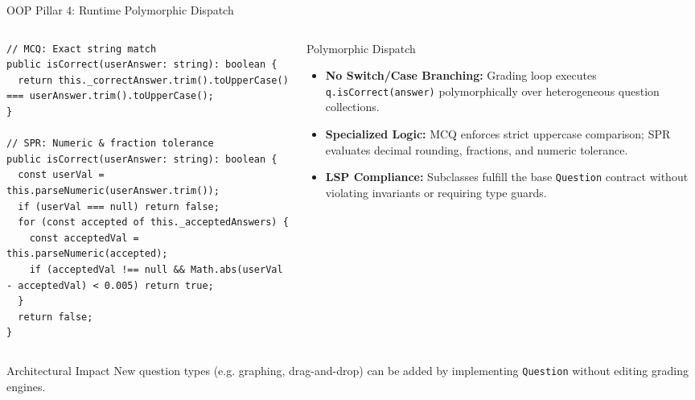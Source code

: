 ﻿\documentclass[aspectratio=169,10pt,t]{beamer}
\begin{document}
\begin{frame}[fragile]{OOP Pillar 4: Runtime Polymorphic Dispatch}
  \vspace{-1.0mm}
  \begin{columns}[T,onlytextwidth]
    \begin{column}{0.54\textwidth}
      \begin{codeBox}
\begin{lstlisting}
// MCQ: Exact string match
public isCorrect(userAnswer: string): boolean {
  return this._correctAnswer.trim().toUpperCase() === userAnswer.trim().toUpperCase();
}

// SPR: Numeric & fraction tolerance
public isCorrect(userAnswer: string): boolean {
  const userVal = this.parseNumeric(userAnswer.trim());
  if (userVal === null) return false;
  for (const accepted of this._acceptedAnswers) {
    const acceptedVal = this.parseNumeric(accepted);
    if (acceptedVal !== null && Math.abs(userVal - acceptedVal) < 0.005) return true;
  }
  return false;
}
\end{lstlisting}
      \end{codeBox}
    \end{column}

    \begin{column}{0.44\textwidth}
      \begin{infoCard}{Polymorphic Dispatch}
        \begin{itemize}\setlength{\itemsep}{1.2pt}\setlength{\parskip}{0pt}\setlength{\leftmargini}{7pt}
          \item \textbf{No Switch/Case Branching:} Grading loop executes \lstinline|q.isCorrect(answer)| polymorphically over heterogeneous question collections.
          \item \textbf{Specialized Logic:} MCQ enforces strict uppercase comparison; SPR evaluates decimal rounding, fractions, and numeric tolerance.
          \item \textbf{LSP Compliance:} Subclasses fulfill the base \texttt{Question} contract without violating invariants or requiring type guards.
        \end{itemize}
      \end{infoCard}
    \end{column}
  \end{columns}

  \vspace{0.8mm}
  \begin{hlCard}{Architectural Impact}
    New question types (e.g. graphing, drag-and-drop) can be added by implementing \texttt{Question} without editing grading engines.
  \end{hlCard}
\end{frame}
\end{document}
